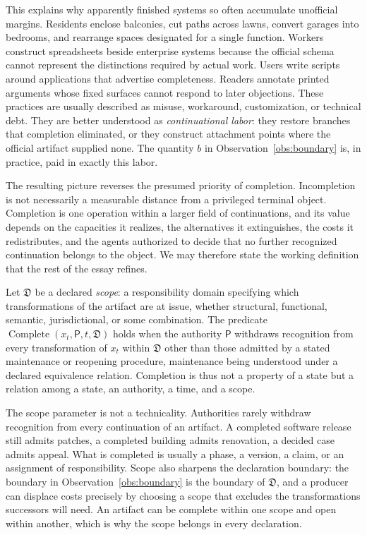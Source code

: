 This explains why apparently finished systems so often accumulate unofficial margins. Residents enclose balconies, cut paths across lawns, convert garages into bedrooms, and rearrange spaces designated for a single function. Workers construct spreadsheets beside enterprise systems because the official schema cannot represent the distinctions required by actual work. Users write scripts around applications that advertise completeness. Readers annotate printed arguments whose fixed surfaces cannot respond to later objections. These practices are usually described as misuse, workaround, customization, or technical debt. They are better understood as \emph{continuational labor}: they restore branches that completion eliminated, or they construct attachment points where the official artifact supplied none. The quantity $b$ in Observation~\ref{obs:boundary} is, in practice, paid in exactly this labor.

The resulting picture reverses the presumed priority of completion. Incompletion is not necessarily a measurable distance from a privileged terminal object. Completion is one operation within a larger field of continuations, and its value depends on the capacities it realizes, the alternatives it extinguishes, the costs it redistributes, and the agents authorized to decide that no further recognized continuation belongs to the object. We may therefore state the working definition that the rest of the essay refines.

\begin{definition}[Completion]\label{def:completion}
Let $\mathfrak{D}$ be a declared \emph{scope}: a responsibility domain specifying which transformations of the artifact are at issue, whether structural, functional, semantic, jurisdictional, or some combination. The predicate $\operatorname{Complete}(x_t,\mathsf{P},t,\mathfrak{D})$ holds when the authority $\mathsf{P}$ withdraws recognition from every transformation of $x_t$ within $\mathfrak{D}$ other than those admitted by a stated maintenance or reopening procedure, maintenance being understood under a declared equivalence relation. Completion is thus not a property of a state but a relation among a state, an authority, a time, and a scope.
\end{definition}

The scope parameter is not a technicality. Authorities rarely withdraw recognition from every continuation of an artifact. A completed software release still admits patches, a completed building admits renovation, a decided case admits appeal. What is completed is usually a phase, a version, a claim, or an assignment of responsibility. Scope also sharpens the declaration boundary: the boundary in Observation~\ref{obs:boundary} is the boundary of $\mathfrak{D}$, and a producer can displace costs precisely by choosing a scope that excludes the transformations successors will need. An artifact can be complete within one scope and open within another, which is why the scope belongs in every declaration.

